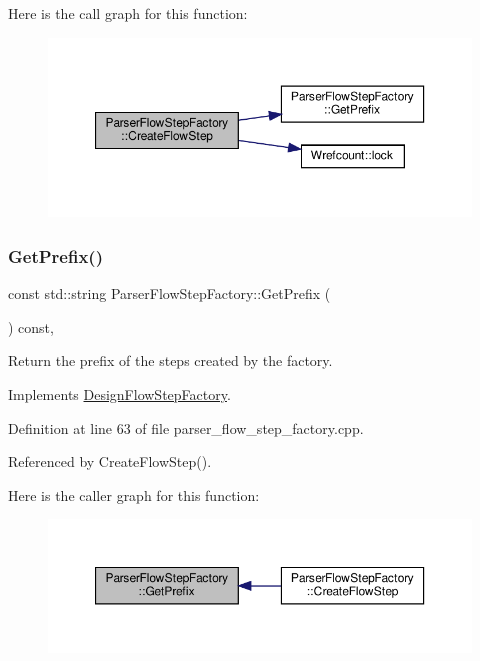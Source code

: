 Here is the call graph for this function\+:
\nopagebreak
\begin{figure}[H]
\begin{center}
\leavevmode
\includegraphics[width=350pt]{d6/ddc/classParserFlowStepFactory_a694b513efdd4a039212c4ce072ceb8f4_cgraph}
\end{center}
\end{figure}
\mbox{\label{classParserFlowStepFactory_adc4d59c9d264adc657113b5991cdf47f}} 
\subsubsection{\texorpdfstring{Get\+Prefix()}{GetPrefix()}}
{\footnotesize\ttfamily const std\+::string Parser\+Flow\+Step\+Factory\+::\+Get\+Prefix (\begin{DoxyParamCaption}{ }\end{DoxyParamCaption}) const\hspace{0.3cm}{\ttfamily [override]}, {\ttfamily [virtual]}}



Return the prefix of the steps created by the factory. 



Implements \hyperlink{classDesignFlowStepFactory_a52abfc00c170b5a63e84431b75eb698e}{Design\+Flow\+Step\+Factory}.



Definition at line 63 of file parser\+\_\+flow\+\_\+step\+\_\+factory.\+cpp.



Referenced by Create\+Flow\+Step().

Here is the caller graph for this function\+:
\nopagebreak
\begin{figure}[H]
\begin{center}
\leavevmode
\includegraphics[width=350pt]{d6/ddc/classParserFlowStepFactory_adc4d59c9d264adc657113b5991cdf47f_icgraph}
\end{center}
\end{figure}


